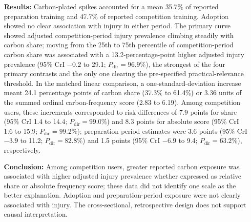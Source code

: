 \textbf{Results:} Carbon-plated spikes accounted for a mean 35.7\% of reported preparation training and 47.7\% of reported competition training. Adoption showed no clear association with injury in either period. The primary curve showed adjusted competition-period injury prevalence climbing steadily with carbon share; moving from the 25th to 75th percentile of competition-period carbon share was associated with a 13.2-percentage-point higher adjusted injury prevalence (95\% CrI $-0.2$ to 29.1; $P_{\mathrm{dir}}=96.9\%$), the strongest of the four primary contrasts and the only one clearing the pre-specified practical-relevance threshold. In the matched linear comparison, a one-standard-deviation increase meant 24.1 percentage points of carbon share (37.3\% to 61.4\%) or 3.36 units of the summed ordinal carbon-frequency score (2.83 to 6.19). Among competition users, these increments corresponded to risk differences of 7.9 points for share (95\% CrI 1.4 to 14.4; $P_{\mathrm{dir}}=99.0\%$) and 8.3 points for absolute score (95\% CrI 1.6 to 15.9; $P_{\mathrm{dir}}=99.2\%$); preparation-period estimates were 3.6 points (95\% CrI $-3.9$ to 11.2; $P_{\mathrm{dir}}=82.8\%$) and 1.5 points (95\% CrI $-6.9$ to 9.4; $P_{\mathrm{dir}}=63.2\%$), respectively.

\textbf{Conclusion:} Among competition users, greater reported carbon exposure was associated with higher adjusted injury prevalence whether expressed as relative share or absolute frequency score; these data did not identify one scale as the better explanation. Adoption and preparation-period exposure were not clearly associated with injury. The cross-sectional, retrospective design does not support causal interpretation.
